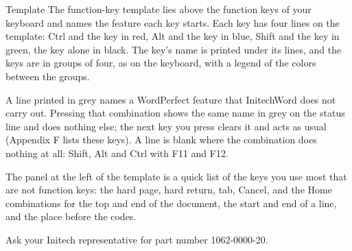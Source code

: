 \begin{Feature}{Template}
The function-key template lies above the function keys of your keyboard and
names the feature each key starts.  Each key has four lines on the template:
Ctrl and the key in red, Alt and the key in blue, Shift and the key in
green, the key alone in black.  The key's name is printed under its lines,
and the keys are in groups of four, as on the keyboard, with a legend of the
colors between the groups.

A line printed in grey names a WordPerfect feature that InitechWord does
not carry out.  Pressing that combination shows the same name in grey on the
status line and does nothing else; the next key you press clears it and acts
as usual (Appendix F lists these keys).  A line is blank where the
combination does nothing at all: Shift, Alt and Ctrl with F11 and F12.

The panel at the left of the template is a quick list of the keys you use
most that are not function keys: the hard page, hard return, tab, Cancel,
and the Home combinations for the top and end of the document, the start and
end of a line, and the place before the codes.

\Notes
{}
Ask your Initech representative for part number 1062-0000-20.

\end{Feature}

